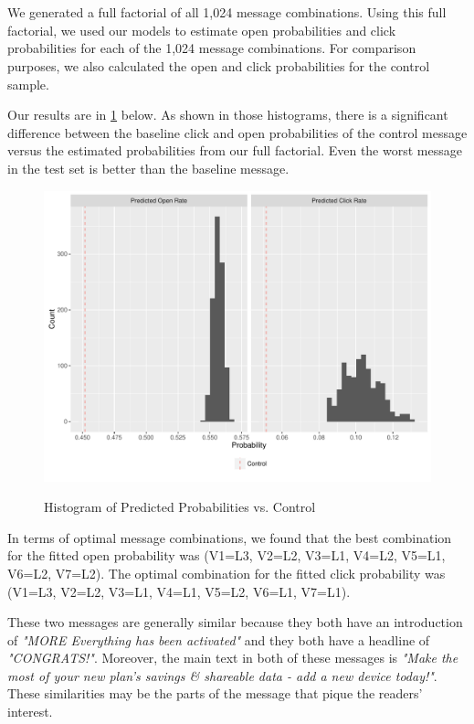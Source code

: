 \section{} %
We generated a full factorial of all 1,024 message combinations. Using this full factorial, we used our models to estimate open probabilities and click probabilities for each of the 1,024 message combinations. For comparison purposes, we also calculated the open and click probabilities for the control sample.

Our results are in \cref{fig:q3_hist} below. As shown in those histograms, there is a significant difference between the baseline click and open probabilities of the control message versus the estimated probabilities from our full factorial. Even the worst message in the test set is better than the baseline message.

\begin{figure}[!htb]
  \centering
  \caption{Histogram of Predicted Probabilities vs. Control}
  \includegraphics[scale=0.5]{q3_hist.pdf}
  \label{fig:q3_hist}
\end{figure}

In terms of optimal message combinations, we found that the best combination for the fitted open probability was (V1=L3, V2=L2, V3=L1, V4=L2, V5=L1, V6=L2, V7=L2). The optimal combination for the fitted click probability was (V1=L3, V2=L2, V3=L1, V4=L1, V5=L2, V6=L1, V7=L1).

These two messages are generally similar because they both have an introduction of \textit{"MORE Everything has been activated"} and they both have a headline of \textit{"CONGRATS!"}. Moreover, the main text in both of these messages is \textit{"Make the most of your new plan’s savings \& shareable data - add a new device today!"}. These similarities may be the parts of the message that pique the readers' interest.

